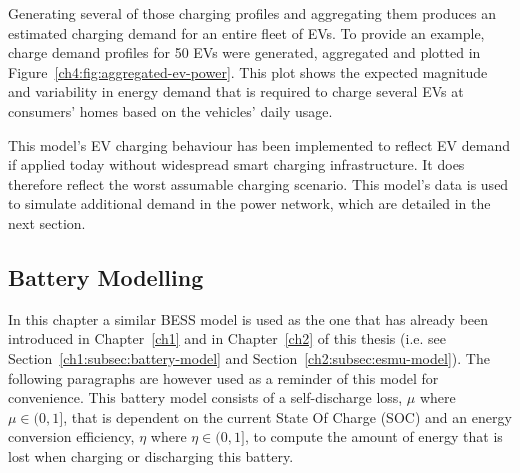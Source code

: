 Generating several of those charging profiles and aggregating them produces an estimated charging demand for an entire fleet of EVs.
To provide an example, charge demand profiles for 50 EVs were generated, aggregated and plotted in Figure~\ref{ch4:fig:aggregated-ev-power}.
This plot shows the expected magnitude and variability in energy demand that is required to charge several EVs at consumers' homes based on the vehicles' daily usage.

This model's EV charging behaviour has been implemented to reflect EV demand if applied today without widespread smart charging infrastructure.
It does therefore reflect the worst assumable charging scenario.
This model's data is used to simulate additional demand in the power network, which are detailed in the next section.

\subsection{Battery Modelling}

In this chapter a similar BESS model is used as the one that has already been introduced in Chapter~\ref{ch1} and in Chapter~\ref{ch2} of this thesis (i.e. see Section~\ref{ch1:subsec:battery-model} and Section~\ref{ch2:subsec:esmu-model}).
The following paragraphs are however used as a reminder of this model for convenience.
This battery model consists of a self-discharge loss, $\mu$ where $\mu \in (0, 1]$, that is dependent on the current State Of Charge (SOC) and an energy conversion efficiency, $\eta$ where $\eta \in (0, 1]$, to compute the amount of energy that is lost when charging or discharging this battery. 

\nomenclature[L]{$\mu$}{Self-discharge loss factor, where $\mu \in (0, 1]$}
\nomenclature[L]{$\eta$}{Energy conversion efficiency, where $\eta \in (0, 1]$}
\nomenclature[L]{$\hat{\eta}$}{Direction dependent energy conversion efficiency, where $\hat{\eta} \in (0, 1]$}

